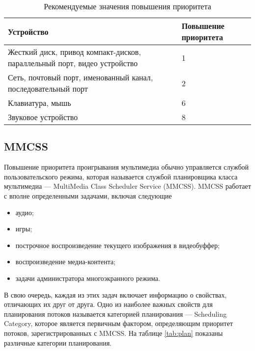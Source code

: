         \begin{table}[h]
            \caption{Рекомендуемые значения повышения приоритета}
            \begin{center}
                \begin{tabular}{|p{80mm}|p{40mm}|}
                    \hline
                    Устройство & Повышение приоритета \\
                    \hline
                    Жесткий диск, привод компакт-дисков, параллельный порт, видео устройство & 1 \\
                    \hline
                    Сеть, почтовый порт, именованный канал, последовательный порт & 2 \\
                    \hline
                    Клавиатура, мышь & 6 \\
                    \hline
                    Звуковое устройство & 8 \\
                    \hline
                \end{tabular}
            \end{center}
            \label{tab:recom}
        \end{table}

        \subsection{MMCSS}
        
            Повышение приоритета проигрывания мультимедиа обычно управляется службой пользовательского режима, которая называется службой планировщика класса мультимедиа — MultiMedia Class Scheduler Service (MMCSS). MMCSS работает с вполне определенными задачами, включая следующие
    
            \begin{itemize}
                \item аудио;
                \item игры;
                \item построчное воспроизведение текущего изображения в видеобуффер;
                \item воспроизведение медиа-контента;
                \item задачи администратора многоэкранного режима.
            \end{itemize}
            
            В свою очередь, каждая из этих задач включает информацию о свойствах, отличающих их друг от друга. Одно из наиболее важных свойств для планирования потоков называется категорией планирования — Scheduling Category, которое является первичным фактором, определяющим приоритет потоков, зарегистрированных с MMCSS. На таблице \ref{tab:plan} показаны различные категории планирования.
            

